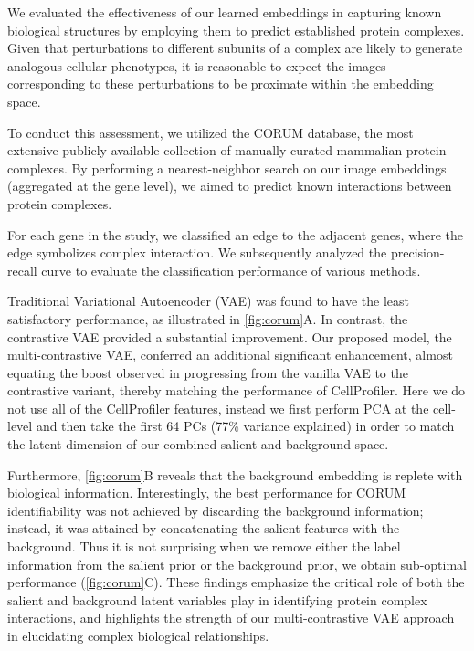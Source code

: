 \documentclass{article}
\begin{document}
We evaluated the effectiveness of our learned embeddings in capturing known biological structures by employing them to predict established protein complexes. Given that perturbations to different subunits of a complex are likely to generate analogous cellular phenotypes, it is reasonable to expect the images corresponding to these perturbations to be proximate within the embedding space.

To conduct this assessment, we utilized the CORUM database, the most extensive publicly available collection of manually curated mammalian protein complexes. By performing a nearest-neighbor search on our image embeddings (aggregated at the gene level), we aimed to predict known interactions between protein complexes.

For each gene in the study, we classified an edge to the adjacent genes, where the edge symbolizes complex interaction. We subsequently analyzed the precision-recall curve to evaluate the classification performance of various methods.

Traditional Variational Autoencoder (VAE) was found to have the least satisfactory performance, as illustrated in \autoref{fig:corum}A. In contrast, the contrastive VAE provided a substantial improvement. Our proposed model, the multi-contrastive VAE, conferred an additional significant enhancement, almost equating the boost observed in progressing from the vanilla VAE to the contrastive variant, thereby matching the performance of CellProfiler. Here we do not use all of the CellProfiler features, instead we first perform PCA at the cell-level and then take the first 64 PCs (77\% variance explained) in order to match the latent dimension of our combined salient and background space.


Furthermore, \autoref{fig:corum}B reveals that the background embedding is replete with biological information. Interestingly, the best performance for CORUM identifiability was not achieved by discarding the background information; instead, it was attained by concatenating the salient features with the background. Thus it is not surprising when we remove either the label information from the salient prior or the background prior, we obtain sub-optimal performance (\autoref{fig:corum}C). These findings emphasize the critical role of both the salient and background latent variables play in identifying protein complex interactions, and highlights the strength of our multi-contrastive VAE approach in elucidating complex biological relationships.
\end{document}

